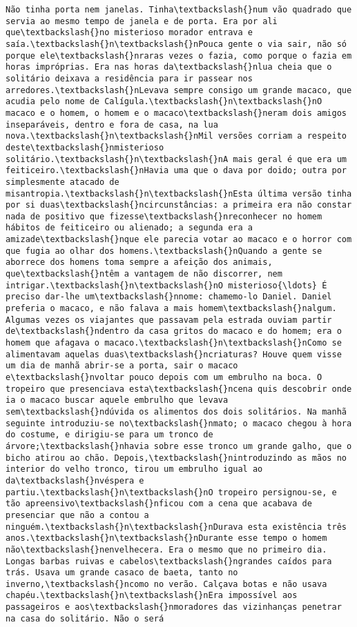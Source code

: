 \begin{Verbatim}[commandchars=\\\{\}]
Não tinha porta nem janelas. Tinha\textbackslash{}num vão quadrado que servia ao mesmo tempo de janela e de porta. Era por ali que\textbackslash{}no misterioso morador entrava e saía.\textbackslash{}n\textbackslash{}nPouca gente o via sair, não só porque ele\textbackslash{}nraras vezes o fazia, como porque o fazia em horas impróprias. Era nas horas da\textbackslash{}nlua cheia que o solitário deixava a residência para ir passear nos arredores.\textbackslash{}nLevava sempre consigo um grande macaco, que acudia pelo nome de Calígula.\textbackslash{}n\textbackslash{}nO macaco e o homem, o homem e o macaco\textbackslash{}neram dois amigos inseparáveis, dentro e fora de casa, na lua nova.\textbackslash{}n\textbackslash{}nMil versões corriam a respeito deste\textbackslash{}nmisterioso solitário.\textbackslash{}n\textbackslash{}nA mais geral é que era um feiticeiro.\textbackslash{}nHavia uma que o dava por doido; outra por simplesmente atacado de misantropia.\textbackslash{}n\textbackslash{}nEsta última versão tinha por si duas\textbackslash{}ncircunstâncias: a primeira era não constar nada de positivo que fizesse\textbackslash{}nreconhecer no homem hábitos de feiticeiro ou alienado; a segunda era a amizade\textbackslash{}nque ele parecia votar ao macaco e o horror com que fugia ao olhar dos homens.\textbackslash{}nQuando a gente se aborrece dos homens toma sempre a afeição dos animais, que\textbackslash{}ntêm a vantagem de não discorrer, nem intrigar.\textbackslash{}n\textbackslash{}nO misterioso{\ldots} É preciso dar-lhe um\textbackslash{}nnome: chamemo-lo Daniel. Daniel preferia o macaco, e não falava a mais homem\textbackslash{}nalgum. Algumas vezes os viajantes que passavam pela estrada ouviam partir de\textbackslash{}ndentro da casa gritos do macaco e do homem; era o homem que afagava o macaco.\textbackslash{}n\textbackslash{}nComo se alimentavam aquelas duas\textbackslash{}ncriaturas? Houve quem visse um dia de manhã abrir-se a porta, sair o macaco e\textbackslash{}nvoltar pouco depois com um embrulho na boca. O tropeiro que presenciava esta\textbackslash{}ncena quis descobrir onde ia o macaco buscar aquele embrulho que levava sem\textbackslash{}ndúvida os alimentos dos dois solitários. Na manhã seguinte introduziu-se no\textbackslash{}nmato; o macaco chegou à hora do costume, e dirigiu-se para um tronco de árvore;\textbackslash{}nhavia sobre esse tronco um grande galho, que o bicho atirou ao chão. Depois,\textbackslash{}nintroduzindo as mãos no interior do velho tronco, tirou um embrulho igual ao da\textbackslash{}nvéspera e partiu.\textbackslash{}n\textbackslash{}nO tropeiro persignou-se, e tão apreensivo\textbackslash{}nficou com a cena que acabava de presenciar que não a contou a ninguém.\textbackslash{}n\textbackslash{}nDurava esta existência três anos.\textbackslash{}n\textbackslash{}nDurante esse tempo o homem não\textbackslash{}nenvelhecera. Era o mesmo que no primeiro dia. Longas barbas ruivas e cabelos\textbackslash{}ngrandes caídos para trás. Usava um grande casaco de baeta, tanto no inverno,\textbackslash{}ncomo no verão. Calçava botas e não usava chapéu.\textbackslash{}n\textbackslash{}nEra impossível aos passageiros e aos\textbackslash{}nmoradores das vizinhanças penetrar na casa do solitário. Não o será 
\end{Verbatim}

